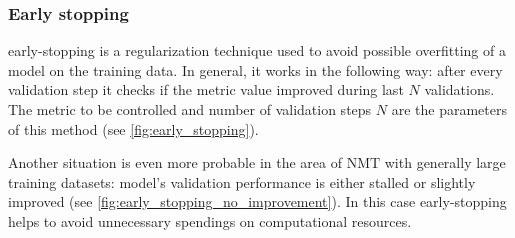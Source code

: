 \subsubsection*{Early stopping}

\Gls{early-stopping} is a regularization technique used to avoid
possible \gls{overfitting} of a model on the training data.
In general, it works in the following way: after every validation step
it checks if the metric value improved during last $N$ validations.
The metric to be controlled and number of validation steps $N$ are
the parameters of this method
(see \cref{fig:early_stopping}).

Another situation is even more probable in the area of NMT with generally
large training datasets: model's validation performance
is either stalled or slightly improved
(see \cref{fig:early_stopping_no_improvement}).
In this case \gls{early-stopping} helps to avoid unnecessary spendings
on computational resources.

